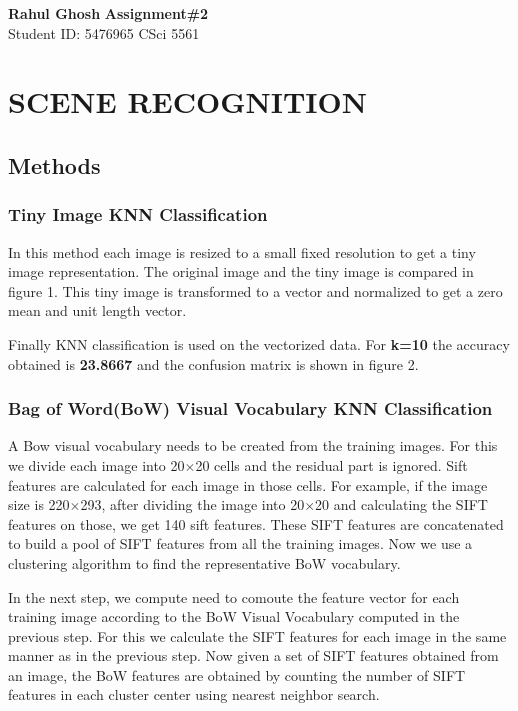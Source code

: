 \documentclass[letter, 11pt]{article}
\begin{document}
\noindent
\large \textbf{Rahul Ghosh} \hfill \textbf{Assignment\#2}\\
\normalsize Student ID: 5476965 \hfill CSci 5561\\

\section*{SCENE RECOGNITION}
\subsection*{Methods}
\subsubsection*{Tiny Image KNN Classification}
In this method each image is resized to a small fixed resolution to get a tiny image representation. The original image and the tiny image is compared in figure 1. This tiny image is transformed to a vector and normalized to get a zero mean and unit length vector. 

Finally KNN classification is used on the vectorized data. For \textbf{k=10} the accuracy obtained is \textbf{23.8667} and the confusion matrix is shown in figure 2.

\subsubsection*{Bag of Word(BoW) Visual Vocabulary KNN Classification}
A Bow visual vocabulary needs to be created from the training images. For this we divide each image into 20$\times$20 cells and the residual part is ignored. Sift features are calculated for each image in those cells.  For example, if the image size is 220$\times$293, after dividing the image into 20$\times$20 and calculating the SIFT features on those, we get 140 sift features. These SIFT features are concatenated to build a pool of SIFT features from all the training images. Now we use a clustering algorithm to find the representative BoW vocabulary.

In the next step, we compute need to comoute the feature vector for each training image according to the  BoW Visual Vocabulary computed in the previous step. For this we calculate the SIFT features for each image in the same manner as in the previous step. Now given a set of SIFT features obtained from an image, the BoW features are obtained by
counting the number of SIFT features in each cluster center using nearest neighbor search.
\end{document}
